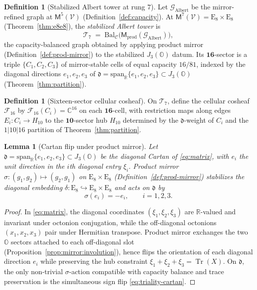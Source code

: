 \documentclass[11pt]{article}
\theoremstyle{plain}
\newtheorem{lemma}[theorem]{Lemma}
\theoremstyle{definition}
\newtheorem{definition}[theorem]{Definition}
\theoremstyle{remark}
\numberwithin{equation}{section}
\newcommand{\R}{\mathbb{R}}
\newcommand{\C}{\mathbb{C}}
\newcommand{\Oct}{\mathbb{O}}
\newcommand{\jalg}{J_3(\mathbb{O})}
\newcommand{\E}[1]{\mathrm{E}_{#1}}
\newcommand{\Tr}{\operatorname{Tr}}
\newcommand{\Void}{\mathcal{V}}
\newcommand{\Mirror}{\mathsf{M}}
\begin{document}
\begin{definition}[Stabilized Albert tower at rung $7$]\label{def:tower7}
Let $\mathcal{G}_{\mathrm{Albert}}$ be the mirror-refined graph at
$\Mirror^5(\Void)$ (Definition~\ref{def:capacity}). At
$\Mirror^7(\Void)=\E{8}\times\E{8}$ (Theorem~\ref{thm:e8e8}), the
\emph{stabilized Albert tower} is
\begin{equation}\label{eq:tower7}
  \mathcal{T}_7
  \;=\;
  \mathrm{Bal}_{\mathcal{C}}\bigl(\Mirror_{\mathrm{prod}}(\mathcal{G}_{\mathrm{Albert}})\bigr),
\end{equation}
the capacity-balanced graph obtained by applying product mirror
(Definition~\ref{def:prod-mirror}) to the stabilized $\jalg$ datum. Its
$\mathbf{16}$-sector is a triple $\{C_1,C_2,C_3\}$ of mirror-stable cells of
equal capacity $16/81$, indexed by the diagonal directions
$e_1,e_2,e_3$ of $\mathfrak{d}=\mathrm{span}_\R\{e_1,e_2,e_3\}\subset\jalg$
(Theorem~\ref{thm:partition}).
\end{definition}

\begin{definition}[Sixteen-sector cellular cosheaf]\label{def:F16}
On $\mathcal{T}_7$, define the cellular cosheaf $\mathcal{F}_{16}$ by
$\mathcal{F}_{16}(C_i)=\C^{16}$ on each $\mathbf{16}$-cell, with restriction
maps along edges $E_i:C_i\to H_{10}$ to the $\mathbf{10}$-sector hub $H_{10}$
determined by the $\mathfrak{d}$-weight of $C_i$ and the $1|10|16$ partition
of Theorem~\ref{thm:partition}.
\end{definition}

\begin{lemma}[Cartan flip under product mirror]\label{lem:triality-cartan}
Let $\mathfrak{d}=\mathrm{span}_\R\{e_1,e_2,e_3\}\subset\jalg$ be the diagonal
Cartan of \eqref{eq:matrix}, with $e_i$ the unit direction in the $i$th diagonal
entry $\xi_i$. Product mirror
$\sigma:(g_1,g_2)\mapsto(g_2,g_1)$ on $\E{8}\times\E{8}$
(Definition~\ref{def:prod-mirror}) stabilizes the diagonal embedding
$\delta:\E{8}\hookrightarrow\E{8}\times\E{8}$ and acts on $\mathfrak{d}$ by
\begin{equation}\label{eq:triality-cartan}
  \sigma(e_i)=-e_i,
  \qquad i=1,2,3.
\end{equation}
\end{lemma}

\begin{proof}
In \eqref{eq:matrix}, the diagonal coordinates $(\xi_1,\xi_2,\xi_3)$ are
$\R$-valued and invariant under octonion conjugation, while the off-diagonal
octonions $(x_1,x_2,x_3)$ pair under Hermitian transpose. Product mirror
exchanges the two $\Oct$ sectors attached to each off-diagonal slot
(Proposition~\ref{prop:mirror:involution}), hence flips the orientation of each
diagonal direction $e_i$ while preserving the hub constraint
$\xi_1+\xi_2+\xi_3=\Tr(X)$. On $\mathfrak{d}$, the only non-trivial
$\sigma$-action compatible with capacity balance and trace preservation is the
simultaneous sign flip \eqref{eq:triality-cartan}.
\end{proof}
\end{document}
